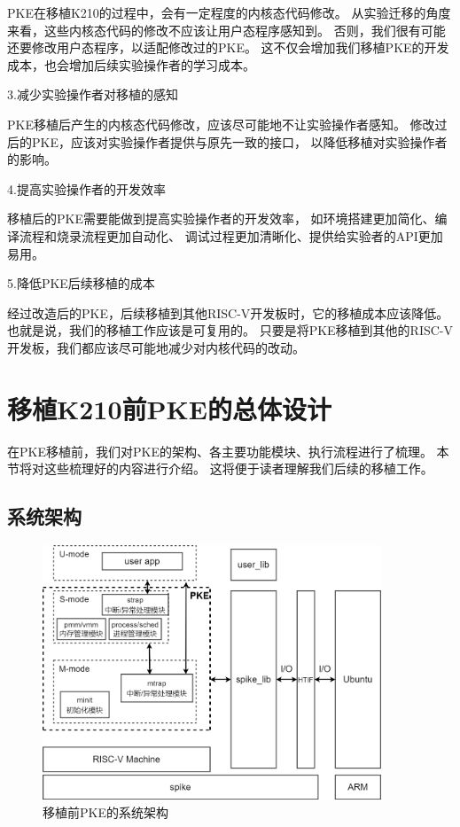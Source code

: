 PKE在移植K210的过程中，会有一定程度的内核态代码修改。
从实验迁移的角度来看，这些内核态代码的修改不应该让用户态程序感知到。
否则，我们很有可能还要修改用户态程序，以适配修改过的PKE。
这不仅会增加我们移植PKE的开发成本，也会增加后续实验操作者的学习成本。

3.减少实验操作者对移植的感知
    
PKE移植后产生的内核态代码修改，应该尽可能地不让实验操作者感知。
修改过后的PKE，应该对实验操作者提供与原先一致的接口，
以降低移植对实验操作者的影响。

4.提高实验操作者的开发效率
    
移植后的PKE需要能做到提高实验操作者的开发效率，
如环境搭建更加简化、编译流程和烧录流程更加自动化、
调试过程更加清晰化、提供给实验者的API更加易用。
    
5.降低PKE后续移植的成本

经过改造后的PKE，后续移植到其他RISC-V开发板时，它的移植成本应该降低。
也就是说，我们的移植工作应该是可复用的。
只要是将PKE移植到其他的RISC-V开发板，我们都应该尽可能地减少对内核代码的改动。

\section{移植K210前PKE的总体设计}

在PKE移植前，我们对PKE的架构、各主要功能模块、执行流程进行了梳理。
本节将对这些梳理好的内容进行介绍。
这将便于读者理解我们后续的移植工作。

\subsection{系统架构}

\begin{figure}[h]
    \vspace{13pt} %
    \centering
    \includegraphics[width=0.9\textwidth]{images/before_sys_struct_new.drawio.png}
    \caption{移植前PKE的系统架构}\label{移植前PKE的系统架构} %
\end{figure}

